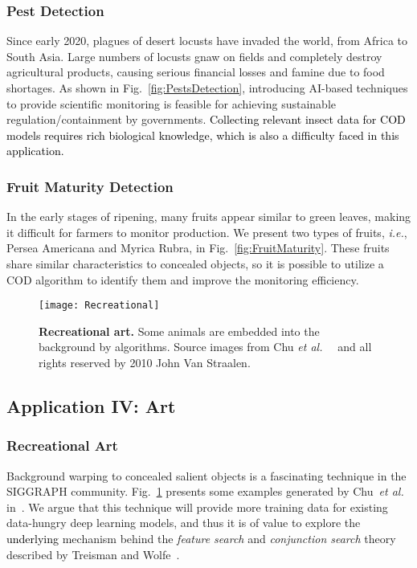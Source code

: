 \documentclass[10pt,journal,compsoc]{IEEEtran}
\def\ie{\emph{i.e.}}
\def\etal{{\em et al.~}}
\newcommand{\figref}[1]{Fig.~\ref{#1}}
\newcommand{\Rev}[1]{\textcolor{black}{#1}}
\begin{document}
\subsubsection{Pest Detection}
Since early 2020, plagues of desert locusts have invaded the world, 
from Africa to South Asia. Large numbers of locusts gnaw on fields and 
completely destroy agricultural products, 
causing serious financial losses and famine due to food shortages. 
As shown in \figref{fig:PestsDetection}, 
introducing AI-based techniques to provide scientific monitoring is 
feasible for achieving sustainable regulation/containment by governments.
\Rev{Collecting relevant insect data for COD models requires rich biological knowledge, which is also a difficulty faced in this application.}

\subsubsection{Fruit Maturity Detection}
In the early stages of ripening, many fruits appear similar to green leaves,
making it difficult for farmers to monitor production. 
We present two types of fruits, \ie, Persea Americana and Myrica Rubra, 
in \figref{fig:FruitMaturity}. These fruits share similar characteristics 
to concealed objects, so it is possible to utilize a COD algorithm 
to identify them and improve the monitoring efficiency.

\begin{figure}[t!]
  \centering
  \texttt{[image: Recreational]} \\
  \vspace{-12pt}
  \caption{\textbf{Recreational art.}
	Some animals are embedded into the background by algorithms. 
    Source images from Chu \etal~\cite{chu2010camouflage} 
    and all rights reserved by 2010 John Van Straalen. 
  }\label{fig:Recreational}
\end{figure}

\subsection{Application IV: Art}
\subsubsection{Recreational Art}
Background warping to concealed salient objects is a fascinating technique 
in the SIGGRAPH community. 
\figref{fig:Recreational} presents some examples generated by Chu~\etal 
in~\cite{chu2010camouflage}. We argue that this technique will provide more 
training data for existing data-hungry deep learning models, 
and thus it is of value to explore the \Rev{underlying} mechanism behind the 
\textit{feature search} and \textit{conjunction search} theory described 
by Treisman and Wolfe~\cite{treisman1988features,wolfe1994guided}.
\end{document}
